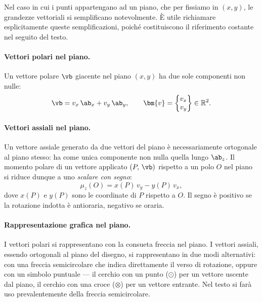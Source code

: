 Nel caso in cui i punti appartengano ad un piano, che per fissiamo in
$(x,y)$, le grandezze vettoriali si semplificano notevolmente.
È utile richiamare esplicitamente queste semplificazioni, poiché
costituiscono il riferimento costante nel seguito del testo.

\paragraph{Vettori polari nel piano.}
Un vettore polare $\vb$ giacente nel piano $(x,y)$ ha due sole
componenti non nulle:
\begin{equation}
	\vb = v_x\,\ab_x + v_y\,\ab_y, \qquad
	\bm{v} = \begin{Bmatrix} v_x \\ v_y \end{Bmatrix} \in \mathbb{R}^2.
\end{equation}

\paragraph{Vettori assiali nel piano.}
Un vettore assiale generato da due vettori del piano è necessariamente
ortogonale al piano stesso: ha come unica componente non nulla quella
lungo $\ab_z$. Il momento polare di un vettore applicato $(P,\,\vb)$
rispetto a un polo $O$ nel piano si riduce dunque a uno
\textit{scalare con segno}:
\begin{equation}\label{eq:momento_piano}
	\mu_z(O) = x(P)\,v_y - y(P)\,v_x,
\end{equation}
dove $x(P)$ e $y(P)$ sono le coordinate di $P$ rispetto a $O$.
Il segno è positivo se la rotazione indotta è antioraria, negativo
se oraria.

\paragraph{Rappresentazione grafica nel piano.}
I vettori polari si rappresentano con la consueta freccia nel piano.
I vettori assiali, essendo ortogonali al piano del disegno, si
rappresentano in due modi alternativi: con una freccia semicircolare
che indica direttamente il verso di rotazione, oppure con un simbolo
puntuale --- il cerchio con un punto ($\odot$) per un vettore uscente
dal piano, il cerchio con una croce ($\otimes$) per un vettore
entrante. Nel  testo si farà uso prevalentemente della
freccia semicircolare.


